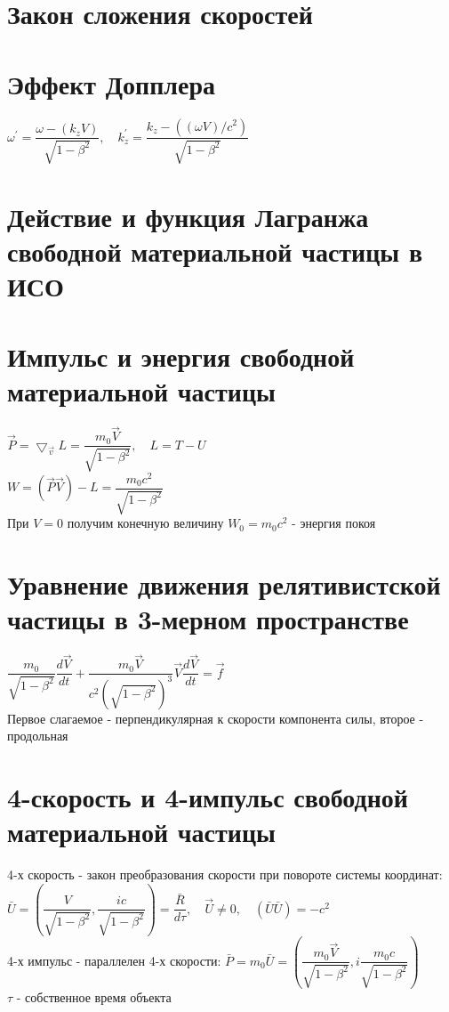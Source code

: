 \begin{multicols*}{2}
		\section{Закон сложения скоростей}
		
		\section{Эффект Допплера}
		$\omega^\prime = \dfrac{\omega - (k_z V)}{\sqrt{1-\beta^2}}, \quad k_z^\prime = \dfrac{k_z - ((\omega V)/c^2)}{\sqrt{1-\beta^2}}$

		\section{Действие и функция Лагранжа свободной материальной частицы в ИСО}
		
		\section{Импульс и энергия свободной материальной частицы}
		$\vec{P} = \bigtriangledown_{\vec{v}}L = \dfrac{m_0\vec{V}}{\sqrt{1-\beta^2}}, \quad L = T-U$\\
		$W = (\vec{P}\vec{V})-L = \dfrac{m_0c^2}{\sqrt{1-\beta^2}}$\\
		При $V = 0$ получим конечную величину $W_0 = m_0c^2$ - энергия покоя
		
		\section{Уравнение движения релятивистской частицы в 3-мерном пространстве}
		$\dfrac{m_0}{\sqrt{1-\beta^2}}\dfrac{d\vec{V}}{dt} + \dfrac{m_0 \vec{V}}{c^2(\sqrt{1-\beta^2})^3}\vec{V} \dfrac{d\vec{V}}{dt} = \vec{f}$\\
		Первое слагаемое - перпендикулярная к скорости компонента силы, второе - продольная
		
		\section{4-скорость и 4-импульс свободной материальной частицы}
		4-х скорость - закон преобразования скорости при повороте системы координат:\\
		$\bar{U} = (\dfrac{V}{\sqrt{1-\beta^2}}, \dfrac{ic}{\sqrt{1-\beta^2}}) = \dfrac{\bar{R}}{d\tau}, \quad \vec{U} \neq 0,\quad (\bar{U}\bar{U}) = -c^2$\\
		4-х импульс - параллелен 4-х скорости: $\bar{P} = m_0\bar{U} = (\dfrac{m_0\vec{V}}{\sqrt{1-\beta^2}}, i\dfrac{m_0c}{\sqrt{1-\beta^2}})$\\
		$\tau$ - собственное время объекта
		

\end{multicols*}
